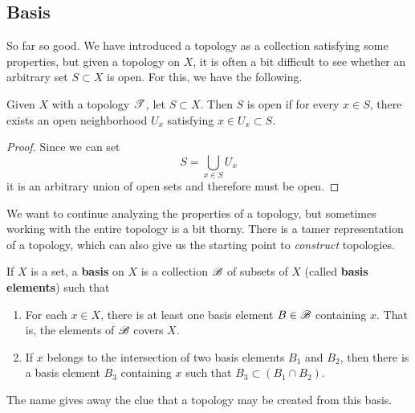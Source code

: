 \subsection{Basis} 

  So far so good. We have introduced a topology as a collection satisfying some properties, but given a topology on $X$, it is often a bit difficult to see whether an arbitrary set $S \subset X$ is open. For this, we have the following. 

  \begin{lemma}
    Given $X$ with a topology $\operatorname{\mathscr{T}}$, let $S \subset X$. Then $S$ is open if for every $x \in S$, there exists an open neighborhood $U_x$ satisfying $x \in U_x \subset S$. 
  \end{lemma}
  \begin{proof}
    Since we can set 
    \begin{equation}
      S = \bigcup_{x \in S} U_x
    \end{equation}
    it is an arbitrary union of open sets and therefore must be open. 
  \end{proof}

  We want to continue analyzing the properties of a topology, but sometimes working with the entire topology is a bit thorny. There is a tamer representation of a topology, which can also give us the starting point to \textit{construct} topologies. 

  \begin{definition}[Basis] 
    \label{def:basis}
    If $X$ is a set, a \textbf{basis} on $X$ is a collection $\operatorname{\mathscr{B}}$ of subsets of $X$ (called \textbf{basis elements}) such that
    \begin{enumerate}
      \item For each $x \in X$, there is at least one basis element $B \in \operatorname{\mathscr{B}}$ containing $x$. That is, the elements of $\operatorname{\mathscr{B}}$ covers $X$. 
      \item If $x$ belongs to the intersection of two basis elements $B_1$ and $B_2$, then there is a basis element $B_3$ containing $x$ such that $B_3 \subset (B_1 \cap B_2)$. 
    \end{enumerate}
  \end{definition} 

  The name gives away the clue that a topology may be created from this basis.  

